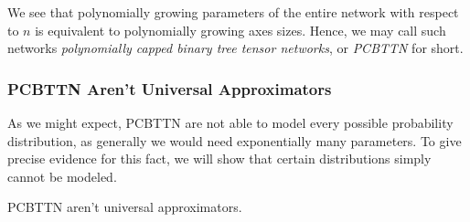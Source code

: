 \documentclass[../../main.tex]{subfiles}
\begin{document}
    We see that polynomially growing parameters of the entire network with respect to $n$ is equivalent to polynomially growing axes sizes. Hence, we may call such networks \emph{polynomially capped binary tree tensor networks}, or \emph{PCBTTN} for short.

    \subsubsection{PCBTTN Aren't Universal Approximators}
    As we might expect, PCBTTN are not able to model every possible probability distribution, as generally we would need exponentially many parameters. To give precise evidence for this fact, we will show that certain distributions simply cannot be modeled.

    \begin{theorem}
        PCBTTN aren't universal approximators.
    \end{theorem}
\end{document}
